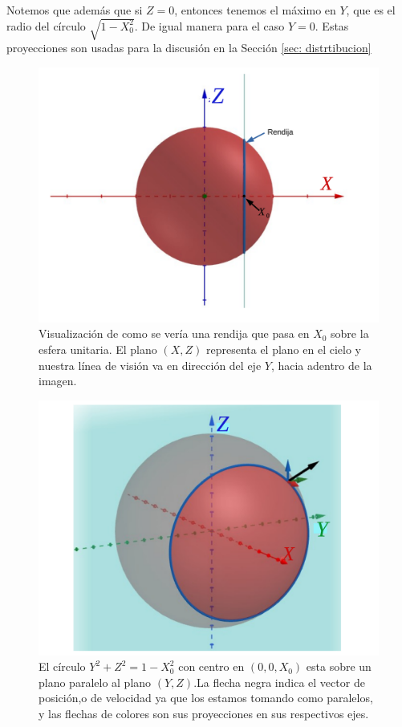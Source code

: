\documentclass{book}
\begin{document}
Notemos que además que si $Z=0$, entonces tenemos el máximo en $Y$,
que es el radio del círculo $\sqrt{1-X_0^2}$. De igual manera para el
caso $Y=0$. Estas proyecciones son usadas para la discusión en la
Sección \ref{sec: distrtibucion}

\begin{figure}
    \centering
    \includegraphics[width=\textwidth]{imagenes_corregidas/PV 01.pdf}
    \caption{Visualización de como se vería una rendija que pasa en $X_0$ sobre la esfera unitaria. El plano $(X,Z)$ representa el plano en el cielo y nuestra línea de visión va en dirección del eje $Y$, hacia adentro de la imagen.}
    \label{fig: ap PV rendija}
\end{figure}

\begin{figure}
    \centering
    \includegraphics[width=\textwidth]{imagenes_corregidas/PV 02.pdf}
    \caption{El círculo $Y^2+Z^2=1-X_0^2$ con centro en $(0,0,X_0)$ esta sobre un plano paralelo al plano $(Y,Z)$.La flecha negra indica el vector de posición,o de velocidad ya que los estamos tomando como paralelos, y las flechas de colores son sus proyecciones en sus respectivos ejes.}
    \label{fig:ap PV esfera3d}
\end{figure}
\end{document}
